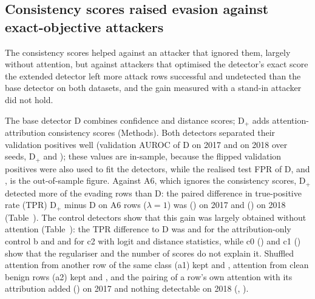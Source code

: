 \subsection*{Consistency scores raised evasion against exact-objective attackers}
\label{sec:rq2}
The consistency scores helped against an attacker that ignored them, largely without attention, but against attackers
that optimised the detector's exact score the extended detector left more attack rows successful and undetected than
the base detector on both datasets, and the gain measured with a stand-in attacker did not hold.

The base detector D combines confidence and distance scores; D$_+$ adds \nConsistency{} attention-attribution
consistency scores (Methods).
Both detectors separated their validation positives well (validation AUROC of D \valAurocDSeventeenRange{} on 2017
and \valAurocDEighteenRange{} on 2018 over seeds, D$_+$ \valAurocDplusSeventeenRange{} and
\valAurocDplusEighteenRange); these values are in-sample, because the flipped validation positives were also used to fit
the detectors, while the realised test FPR of D, \testFprDSeventeenRange{} and \testFprDEighteenRange, is the
out-of-sample figure.
Against A6, which ignores the consistency scores, D$_+$ detected more of the evading rows than D: the paired difference
in true-positive rate (TPR) D$_+$ minus D on A6 rows ($\lambda = 1$) was \tprAsixOneVoneSeventeen{}
(\tprAsixOneVoneSeventeenCI) on 2017 and \tprAsixOneVoneEighteen{} (\tprAsixOneVoneEighteenCI) on 2018
(Table~\mainTabAttacks).
The control detectors show that this gain was largely obtained without attention (Table~\mainTabControls): the TPR
difference to D was \ablBMinusDSeventeen{} and \ablBMinusDEighteen{} for the attribution-only control b and
\ablCtwoMinusDSeventeen{} and \ablCtwoMinusDEighteen{} for c2 with logit and distance statistics, while c0
(\ablCzeroMinusDSeventeen) and c1 (\ablConeMinusDSeventeen) show that the regulariser and the number of scores do not
explain it.
Shuffled attention from another row of the same class (a1) kept \ablAoneMinusDSeventeen{} and
\ablAoneMinusDEighteen, attention from clean benign rows (a2) kept \ablAtwoMinusDSeventeen{} and
\ablAtwoMinusDEighteen, and the pairing of a row's own attention with its attribution added \ablPairSeventeen{}
(\ablPairSeventeenCI) on 2017 and nothing detectable on 2018 (\ablPairEighteen, \ablPairEighteenCI).

